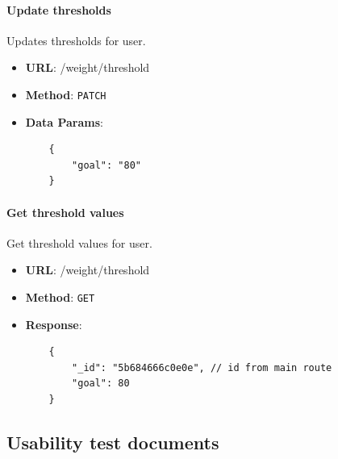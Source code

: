         \paragraph{Update thresholds} Updates thresholds for user.
        \begin{itemize}
            \item \textbf{URL}: /weight/threshold
            \item \textbf{Method}: \texttt{PATCH}
            \item \textbf{Data Params}: \begin{verbatim}
    {
        "goal": "80"
    }  
            \end{verbatim}
        \end{itemize}

        \paragraph{Get threshold values} Get threshold values for user.
        \begin{itemize}
            \item \textbf{URL}: /weight/threshold
            \item \textbf{Method}: \texttt{GET}
            \item \textbf{Response}: \begin{verbatim}
    {
        "_id": "5b684666c0e0e", // id from main route
        "goal": 80
    }
            \end{verbatim}
        \end{itemize}

\subsection{Usability test documents}